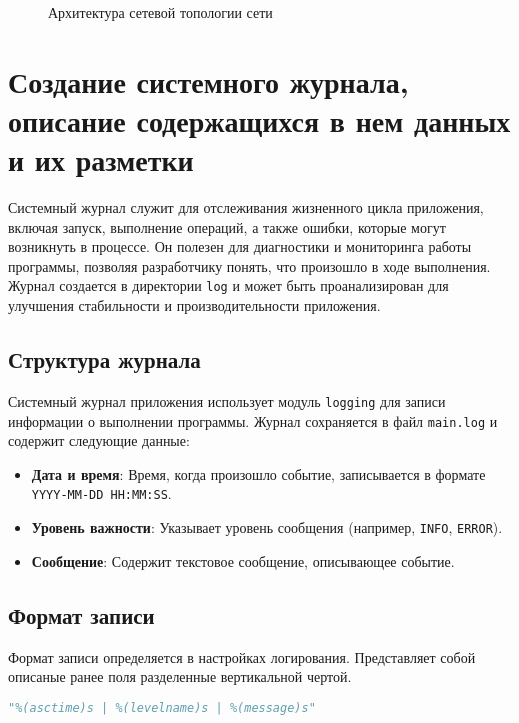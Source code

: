 \begin{figure}[h!tp]
    \caption{Архитектура сетевой топологии сети}
    \label{fig:vm:run:web}
\end{figure}

\section{Создание системного журнала,
	описание содержащихся в нем данных и их разметки}

Системный журнал служит для отслеживания жизненного цикла приложения,
включая запуск, выполнение операций,
а также ошибки, которые могут возникнуть в процессе.
Он полезен для диагностики и мониторинга работы программы,
позволяя разработчику понять, что произошло в ходе выполнения.
Журнал создается в директории \texttt{log}
и может быть проанализирован для улучшения стабильности
и производительности приложения.

\subsection{Структура журнала}

Системный журнал приложения использует модуль \texttt{logging}
для записи информации о выполнении программы.
Журнал сохраняется в файл \texttt{main.log} и содержит следующие данные:

\begin{itemize}
    \item \textbf{Дата и время}:
		Время, когда произошло событие,
		записывается в формате \texttt{YYYY-MM-DD HH:MM:SS}.
    \item \textbf{Уровень важности}:
		Указывает уровень сообщения (например, \texttt{INFO}, \texttt{ERROR}).
    \item \textbf{Сообщение}:
		Содержит текстовое сообщение, описывающее событие.
\end{itemize}

\subsection{Формат записи}

Формат записи определяется в настройках логирования.
Представляет собой описаные ранее поля разделенные вертикальной чертой.

\begin{lstlisting}[language=Python, caption=\leftline{Форматирование строки лога}]
	"%(asctime)s | %(levelname)s | %(message)s"
\end{lstlisting}

